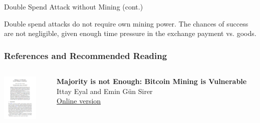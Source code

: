 \documentclass[handout]{beamer}
\begin{document}
\begin{frame}{Double Spend Attack without Mining (cont.)}

Double spend attacks \color{focus} do not require own mining power.\color{black} The chances of success are not negligible, given enough time pressure in the exchange payment vs. goods.
\vspace{1.5 em}



\end{frame}


\begin{frame}%
\frametitle{References and Recommended Reading}

		\begin{columns}[T]
			\begin{column}{0.1\textwidth}
					\includegraphics[width = 1.7cm, frame]{../assets/images/Mining_cover}
			\end{column} %
			\begin{column}{0.8\textwidth}
				\textbf{Majority is not Enough: Bitcoin Mining is Vulnerable} \\ 
				Ittay Eyal and Emin Gün Sirer \\
				\link \href{https://www.cs.cornell.edu/~ie53/publications/btcProcFC.pdf}{Online version}
			\end{column}
		\end{columns}
	

\end{frame}
\end{document}
